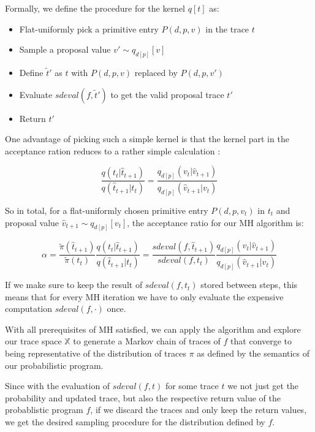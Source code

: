 Formally, we define the procedure for the kernel $q[t]$ as:

\begin{itemize}
\item Flat-uniformly pick a primitive entry $P(d,p,v)$ in the trace $t$
\item Sample a proposal value $v' \sim q_{d[p]}[v]$
\item Define $\tilde{t}'$ as $t$ with $P(d,p,v)$ replaced by $P(d,p,v')$
\item Evaluate $sdeval(f,\tilde{t}')$ to get the valid proposal trace $t'$
\item Return $t'$
\end{itemize}

One advantage of picking such a simple kernel is that the kernel part in the acceptance ration reduces to a rather simple calculation \cite{wingate2011lightweight}:

\begin{equation*}
\frac{q(t_t | \hat{t}_{t+1})}{q(\hat{t}_{t+1} | t_t)} = \frac{q_{d[p]}(v_t | \hat{v}_{t+1})}{q_{d[p]}(\hat{v}_{t+1} | v_t)}
\end{equation*}


So in total, for a flat-uniformly chosen primitive entry $P(d,p,v_t)$ in $t_t$ and proposal value $\hat{v}_{t+1} \sim q_{d[p]}[v_t]$, the acceptance ratio for our MH algorithm is:

\begin{equation*}
\alpha = \frac{\tilde{\pi}(\hat{t}_{t+1})}{\tilde{\pi}(t_t)} \frac{q(t_t | \hat{t}_{t+1})}{q(\hat{t}_{t+1} | t_t)} = \frac{sdeval(f, \hat{t}_{t+1})}{sdeval(f, t_t)} \frac{q_{d[p]}(v_t | \hat{v}_{t+1})}{q_{d[p]}(\hat{v}_{t+1} | v_t)}
\end{equation*}

If we make sure to keep the result of $sdeval(f, t_t)$ stored between steps, this means that for every MH iteration we have to only evaluate the expensive computation $sdeval(f, \cdot)$ once.

With all prerequisites of MH satisfied, we can apply the algorithm and explore our trace space $\mathbb{X}$ to generate a Markov chain of traces of $f$ that converge to being representative of the distribution of traces $\pi$ as defined by the semantics of our probabilistic program.

Since with the evaluation of $sdeval(f,t)$ for some trace $t$ we not just get the probability and updated trace, but also the respective return value of the probablistic program $f$, if we discard the traces and only keep the return values, we get the desired sampling procedure for the distribution defined by $f$.

